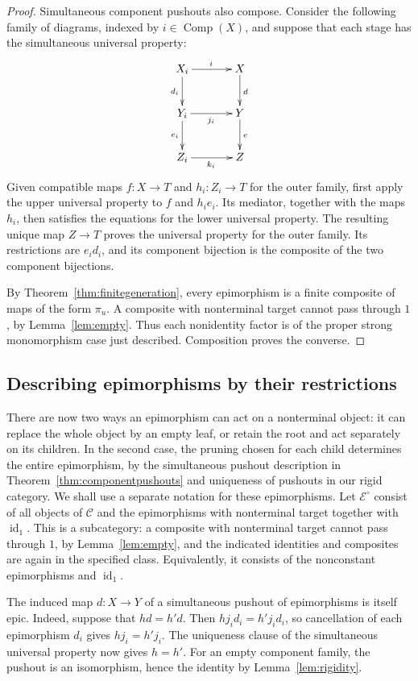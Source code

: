 \documentclass[11pt,a4paper]{article}
\theoremstyle{plain}
\theoremstyle{definition}
\theoremstyle{remark}
\newcommand{\C}{\mathcal C}
\newcommand{\Icat}{\mathcal E^\circ}
\newcommand{\one}{1}
\newcommand{\id}{\operatorname{id}}
\newcommand{\Comp}{\operatorname{Comp}}
\begin{document}
\begin{proof}
Simultaneous component pushouts also compose. Consider the following
family of diagrams, indexed by $i\in\Comp(X)$, and suppose that
each stage has the simultaneous universal property:
\[
\xymatrix@C=3.5em@R=2.5em{
X_i\ar[r]^i\ar[d]_{d_i}&X\ar[d]^d\\
Y_i\ar[r]_{j_i}\ar[d]_{e_i}&Y\ar[d]^e\\
Z_i\ar[r]_{k_i}&Z
}
\]
Given compatible maps $f:X\to T$ and $h_i:Z_i\to T$ for the
outer family, first apply the upper universal property to $f$
and $h_i e_i$. Its mediator, together with the maps $h_i$, then
satisfies the equations for the lower universal property. The
resulting unique map $Z\to T$ proves the universal property
for the outer family. Its restrictions are $e_i d_i$, and its
component bijection is the composite of the two component
bijections.

By Theorem~\ref{thm:finitegeneration}, every epimorphism is a finite
composite of maps of the form $\pi_u$. A composite with nonterminal target
cannot pass through $\one$, by Lemma~\ref{lem:empty}. Thus each
nonidentity factor is of the proper strong monomorphism case just described.
Composition proves the converse.
\end{proof}

\subsection{Describing epimorphisms by their restrictions}\label{sec:epi-restrictions}
There are now two ways an epimorphism can act on a nonterminal
object: it can replace the whole object by an empty leaf, or retain
the root and act separately on its children. In the second case,
the pruning chosen for each child determines the entire
epimorphism, by the simultaneous pushout description in
Theorem~\ref{thm:componentpushouts} and uniqueness of pushouts
in our rigid category. We shall use a separate notation for these
epimorphisms.
Let $\Icat$ consist of all objects of $\C$ and the epimorphisms
with nonterminal target together with $\id_\one$. This is a
subcategory: a composite with nonterminal target cannot pass
through $\one$, by Lemma~\ref{lem:empty}, and the indicated
identities and composites are again in the specified class.
Equivalently, it consists of the nonconstant epimorphisms and $\id_\one$.

The induced map $d:X\to Y$ of a simultaneous pushout of
epimorphisms is itself epic. Indeed, suppose that $hd=h'd$.
Then $hj_i d_i=h'j_i d_i$, so cancellation of each epimorphism
$d_i$ gives $hj_i=h'j_i$. The uniqueness clause of the
simultaneous universal property now gives $h=h'$.
For an empty component family, the pushout is an isomorphism,
hence the identity by Lemma~\ref{lem:rigidity}.
\end{document}
